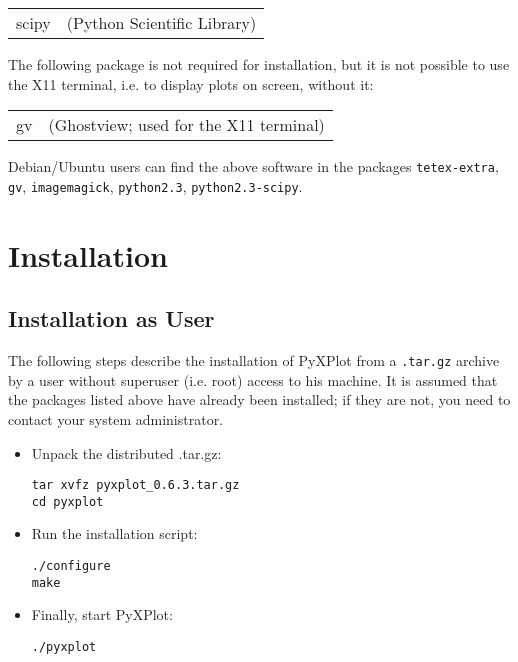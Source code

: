 \documentclass[a4paper,onecolumn,11pt]{book}
\begin{document}
\vspace{0.5cm}
\begin{tabular}{ll} 
scipy   & (Python Scientific Library) \\
\end{tabular}
\vspace{0.5cm}

The following package is not required for installation, but it is not possible
to use the X11 terminal, i.e. to display plots on screen, without it:

\vspace{0.5cm}
\begin{tabular}{ll}
gv      & (Ghostview; used for the X11 terminal) \\
\end{tabular}
\vspace{0.5cm}

Debian/Ubuntu users can find the above software in the packages \texttt{tetex-extra},
\texttt{gv}, \texttt{imagemagick}, \texttt{python2.3},
\texttt{python2.3-scipy}.

\section{Installation}

\subsection{Installation as User}

The following steps describe the installation of PyXPlot from a
\texttt{.tar.gz} archive by a user without superuser (i.e. root) access to his
machine. It is assumed that the packages listed above have already been
installed; if they are not, you need to contact your system administrator.

\begin{itemize}
\item Unpack the distributed .tar.gz:

\begin{verbatim}
tar xvfz pyxplot_0.6.3.tar.gz
cd pyxplot
\end{verbatim}

\item Run the installation script:

\begin{verbatim}
./configure
make
\end{verbatim}

\item Finally, start PyXPlot:

\begin{verbatim}
./pyxplot
\end{verbatim}

\end{itemize}
\end{document}
